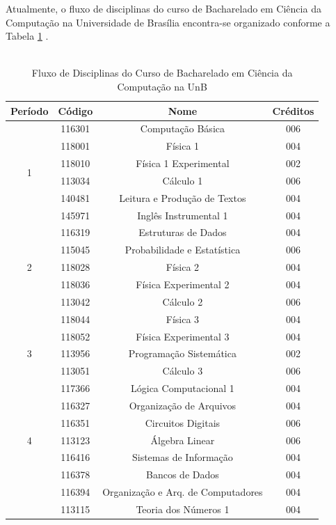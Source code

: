 Atualmente, o fluxo de disciplinas do curso de Bacharelado em Ciência da Computação na Universidade de Brasília encontra-se organizado conforme a Tabela \ref{fluxograma} \citep{fluxo_cic}.
\\ \\
\begin{longtable}{c|ccc}

		\caption{Fluxo de Disciplinas do Curso de Bacharelado em Ciência da Computação na UnB} 	\label{fluxograma} \\
			\hline
		Período & Código & Nome & Créditos\\ 
		\hline
		\multirow{6}{*}{1} & 116301 & Computação Básica & 006\\
		& 118001 & Física 1 & 004\\
		& 118010 & Física 1 Experimental & 002\\ 
		& 113034 & Cálculo 1 & 006\\
		& 140481 & Leitura e Produção de Textos & 004\\
		& 145971 & Inglês Instrumental 1 & 004\\
		\hline
		\multirow{5}{*}{2} & 116319 & Estruturas de Dados & 004\\
		& 115045 & Probabilidade e Estatística & 006\\
		& 118028 & Física 2 & 004\\ 
		& 118036 & Física Experimental 2 & 004\\
		& 113042 & Cálculo 2 & 006\\
		\hline
		\multirow{5}{*}{3} & 118044 & Física 3 & 004\\
		& 118052 & Física Experimental 3 & 004\\
		& 113956 & Programação Sistemática & 002\\ 
		& 113051 & Cálculo 3 & 006\\
		& 117366 & Lógica Computacional 1 & 004\\
		\hline
		\multirow{5}{*}{4} & 116327 & Organização de Arquivos & 004\\
		& 116351 & Circuitos Digitais & 006\\
		& 113123 & Álgebra Linear & 006\\ 
		& 116416 & Sistemas de Informação & 004\\
		\hline
		\multirow{5}{*}{5} & 116378 & Bancos de Dados & 004\\
		& 116394 & Organização e Arq. de Computadores & 004\\
		& 113115 & Teoria dos Números 1 & 004\\ 

\end{longtable}
